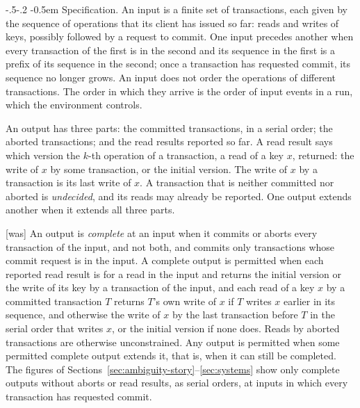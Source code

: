 \documentclass[sigconf]{cidr-2027}
\makeatletter
\theoremstyle{remark}
\renewcommand\paragraph{\@startsection{paragraph}{4}{\z@}%
  {-.5\baselineskip \@plus -2\p@ \@minus -.2\p@}%
  {-0.5em}%
  {\normalfont\bfseries}}
\newcommand{\outrel}{extends\xspace}          %
\makeatother
\begin{document}
\paragraph{Specification.}
An input is a finite set of transactions, each given by the sequence of
operations that its client has issued so far: reads and writes of keys,
possibly followed by a request to commit.  One input precedes another when
every transaction of the first is in the second and its sequence in the first
is a prefix of its sequence in the second; once a transaction has requested
commit, its sequence no longer grows.  An input does not order the operations
of different transactions.  The order in which they arrive is the order of
input events in a run, which the environment controls.

An output has three parts: the committed transactions, in a serial order; the
aborted transactions; and the read results reported so far.  A read result
says which version the $k$-th operation of a transaction, a read of a key $x$,
returned: the write of $x$ by some transaction, or the initial version.  The
write of $x$ by a transaction is its last write of $x$.  A transaction that is
neither committed nor aborted is \emph{undecided}, and its reads may already be
reported.  One output \outrel another when it extends all three parts.



{\footnotesize\color{black!50}\noindent\textsf{[was]} An output is \emph{complete} at an input when it commits or aborts every
transaction of the input, and not both, and commits only transactions whose
commit request is in the input.  A complete output is permitted when each
reported read result is for a read in the input and returns the initial version
or the write of its key by a transaction of the input, and each read of a key
$x$ by a committed transaction $T$ returns $T$'s own write of $x$ if $T$ writes
$x$ earlier in its sequence, and otherwise the write of $x$ by the last
transaction before $T$ in the serial order that writes $x$, or the initial
version if none does.  Reads by aborted transactions are otherwise
unconstrained.  Any output is permitted when some permitted complete output
\outrel it, that is, when it can still be completed.  The figures of
Sections~\ref{sec:ambiguity-story}--\ref{sec:systems} show only complete
outputs without aborts or read results, as serial orders, at inputs in which
every transaction has requested commit.\par}
\end{document}
